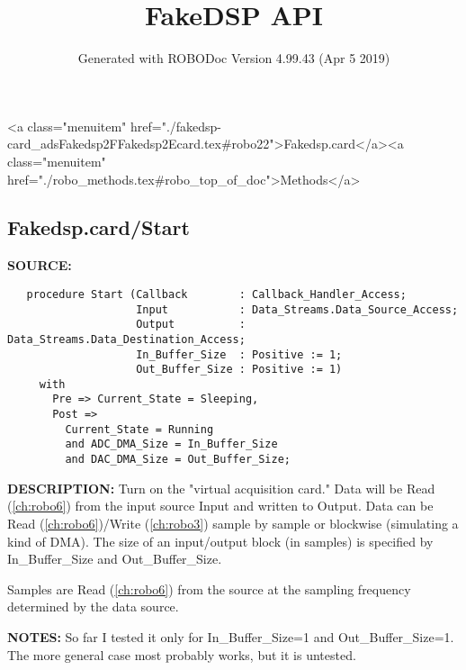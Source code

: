 \documentclass{article}
\title{FakeDSP API}
\author{Generated with ROBODoc Version 4.99.43 (Apr  5 2019)
}
\begin{document}
\maketitle
\printindex
\tableofcontents
\newpage

<a class="menuitem" href="./fakedsp-card_adsFakedsp2FFakedsp2Ecard.tex#robo22">Fakedsp.card</a><a class="menuitem" href="./robo_methods.tex#robo_top_of_doc">Methods</a>\subsection{Fakedsp.card/Start}
\textbf{SOURCE:}\hspace{0.08in}\begin{verbatim}
   procedure Start (Callback        : Callback_Handler_Access;
                    Input           : Data_Streams.Data_Source_Access;
                    Output          : Data_Streams.Data_Destination_Access;
                    In_Buffer_Size  : Positive := 1;
                    Out_Buffer_Size : Positive := 1)
     with
       Pre => Current_State = Sleeping,
       Post => 
         Current_State = Running
         and ADC_DMA_Size = In_Buffer_Size
         and DAC_DMA_Size = Out_Buffer_Size;
\end{verbatim}
\textbf{DESCRIPTION:}\hspace{0.08in}
   Turn on the "virtual acquisition card."  Data will be Read (\ref{ch:robo6}) from the
   input source Input and written to Output.  Data can be Read (\ref{ch:robo6})/Write (\ref{ch:robo3})
   sample by sample or blockwise (simulating a kind of DMA).  The size
   of an input/output block (in samples) is specified by In\_Buffer\_Size
   and Out\_Buffer\_Size.

   

   Samples are Read (\ref{ch:robo6}) from the source at the sampling frequency determined
   by the data source.

\textbf{NOTES:}\hspace{0.08in}
   So far I tested it only for In\_Buffer\_Size=1 and Out\_Buffer\_Size=1.
   The more general case most probably works, but it is untested.
\end{document}
